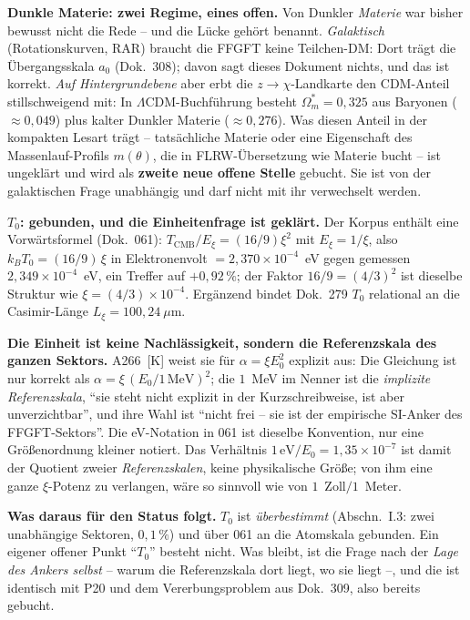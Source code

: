 \documentclass[11pt]{report}
\begin{document}
\textbf{Dunkle Materie: zwei Regime, eines offen.} Von Dunkler
\emph{Materie} war bisher bewusst nicht die Rede -- und die Lücke
gehört benannt. \emph{Galaktisch} (Rotationskurven, RAR) braucht
die FFGFT keine Teilchen-DM: Dort trägt die Übergangsskala $a_0$
(Dok.~308); davon sagt dieses Dokument nichts, und das ist
korrekt. \emph{Auf Hintergrundebene} aber erbt die
$z\to\chi$-Landkarte den CDM-Anteil stillschweigend mit: In
$\Lambda$CDM-Buchführung besteht $\Omega_m^{*} = 0{,}325$ aus
Baryonen ($\approx 0{,}049$) plus kalter Dunkler Materie
($\approx 0{,}276$). Was diesen Anteil in der kompakten Lesart
trägt -- tatsächliche Materie oder eine Eigenschaft des
Massenlauf-Profils $m(\theta)$, die in FLRW-Übersetzung wie
Materie bucht -- ist ungeklärt und wird als \textbf{zweite neue
offene Stelle} gebucht. Sie ist von der galaktischen Frage
unabhängig und darf nicht mit ihr verwechselt werden.

\textbf{$T_0$: gebunden, und die Einheitenfrage ist geklärt.} Der
Korpus enthält eine Vorwärtsformel (Dok.~061):
$T_\text{CMB}/E_\xi = (16/9)\xi^2$ mit $E_\xi = 1/\xi$, also
$k_BT_0 = (16/9)\,\xi$ in Elektronenvolt $= 2{,}370\times10^{-4}$~eV
gegen gemessen $2{,}349\times10^{-4}$~eV, ein Treffer auf
$+0{,}92\,\%$; der Faktor $16/9 = (4/3)^2$ ist dieselbe Struktur wie
$\xi = (4/3)\times10^{-4}$. Ergänzend bindet Dok.~279 $T_0$
relational an die Casimir-Länge $L_\xi = 100{,}24~\mu$m.

\textbf{Die Einheit ist keine Nachlässigkeit, sondern die
Referenzskala des ganzen Sektors.} A266~[K] weist sie für
$\alpha = \xi E_0^2$ explizit aus: Die Gleichung ist nur korrekt als
$\alpha = \xi\,(E_0/1\,\text{MeV})^2$; die $1$~MeV im Nenner ist die
\emph{implizite Referenzskala}, \enquote{sie steht nicht explizit in
der Kurzschreibweise, ist aber unverzichtbar}, und ihre Wahl ist
\enquote{nicht frei -- sie ist der empirische SI-Anker des
FFGFT-Sektors}. Die eV-Notation in 061 ist dieselbe Konvention, nur
eine Größenordnung kleiner notiert. Das Verhältnis
$1\,\text{eV}/E_0 = 1{,}35\times10^{-7}$ ist damit der Quotient
zweier \emph{Referenzskalen}, keine physikalische Größe; von ihm
eine ganze $\xi$-Potenz zu verlangen, wäre so sinnvoll wie von
$1$~Zoll$/1$~Meter.

\textbf{Was daraus für den Status folgt.} $T_0$ ist
\emph{überbestimmt} (Abschn.~I.3: zwei unabhängige Sektoren, $0{,}1\,\%$)
und über 061 an die Atomskala gebunden. Ein eigener offener Punkt
\enquote{$T_0$} besteht nicht. Was bleibt, ist die Frage nach der
\emph{Lage des Ankers selbst} -- warum die Referenzskala dort liegt,
wo sie liegt --, und die ist identisch mit P20 und dem
Vererbungsproblem aus Dok.~309, also bereits gebucht.
\end{document}
